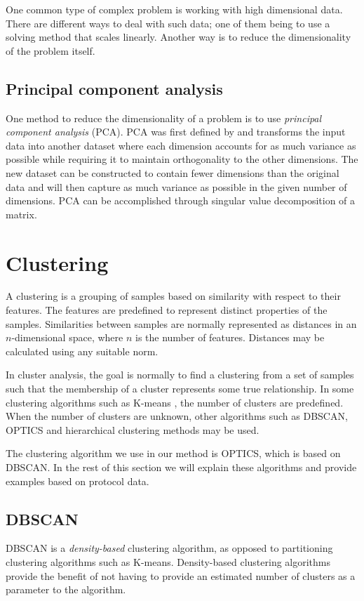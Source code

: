 \documentclass[a4paper]{report}
\begin{document}
One common type of complex problem is working with high dimensional data. There
are different ways to deal with such data; one of them being to use a solving
method that scales linearly. Another way is to reduce the dimensionality of the
problem itself.

\subsection{Principal component analysis}
\label{sec:pca}
One method to reduce the dimensionality of a problem is to use \emph{principal
component analysis} (PCA). PCA was first defined by \citet{pearson01} and
transforms the input data into another dataset where each dimension accounts
for as much variance as possible while requiring it to maintain orthogonality
to the other dimensions. The new dataset can be constructed to contain fewer
dimensions than the original data and will then capture as much variance as
possible in the given number of dimensions. PCA can be accomplished through
singular value decomposition of a matrix.

\section{Clustering}
A clustering is a grouping of samples based on similarity with respect to their
features. The features are predefined to represent distinct properties of the
samples. Similarities between samples are normally represented as distances in
an $n$-dimensional space, where $n$ is the number of features. Distances may be
calculated using any suitable norm.

In cluster analysis, the goal is normally to find a clustering from a
set of samples such that the membership of a cluster represents some true
relationship. In some clustering algorithms such as K-means \citep{macqueen67},
the number of clusters are predefined. When the number of clusters are unknown,
other algorithms such as DBSCAN, OPTICS and hierarchical clustering methods may
be used.

The clustering algorithm we use in our method is OPTICS, which is based on
DBSCAN. In the rest of this section we will explain these algorithms and
provide examples based on protocol data.

\subsection{DBSCAN}
DBSCAN is a \emph{density-based} clustering algorithm, as opposed to
partitioning clustering algorithms such as K-means. Density-based clustering
algorithms provide the benefit of not having to provide an estimated number
of clusters as a parameter to the algorithm.
\end{document}
